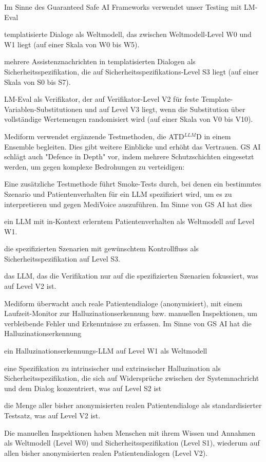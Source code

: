 \documentclass[twocolumn]{article}
\newcommand{\ATDLLMD}{ATD$^{LLM}$D}%
\begin{document}
Im Sinne des Guaranteed Safe AI Frameworks \cite{Dalrymple24} verwendet unser Testing mit LM-Eval
\begin{compactitem}
\item templatisierte Dialoge als Weltmodell, das zwischen Weltmodell-Level W0 und W1 liegt (auf einer Skala von W0 bis W5).
\item mehrere Assistenznachrichten in templatisierten Dialogen als Sicherheitsspezifikation, die auf Sicherheitsspezifikations-Level S3 liegt (auf einer Skala von S0 bis S7).
\item LM-Eval als Verifikator, der auf Verifikator-Level V2 für feste Template-Variablen-Substitutionen und auf Level V3 liegt, wenn die Substitution über vollständige Wertemengen randomisiert wird (auf einer Skala von V0 bis V10).
\end{compactitem}

Mediform verwendet ergänzende Testmethoden, die \ATDLLMD{} in einem Ensemble begleiten. Dies gibt weitere Einblicke und erhöht das Vertrauen. GS AI schlägt auch "Defence in Depth" vor, indem mehrere Schutzschichten eingesetzt werden, um gegen komplexe Bedrohungen zu verteidigen:

Eine zusätzliche Testmethode führt Smoke-Tests durch, bei denen ein bestimmtes Szenario und Patientenverhalten für ein LLM spezifiziert wird, um es zu interpretieren und gegen MediVoice auszuführen. Im Sinne von GS AI hat dies
\begin{compactitem}
\item ein LLM mit in-Kontext erlerntem Patientenverhalten als Weltmodell auf Level W1.
\item die spezifizierten Szenarien mit gewünschtem Kontrollfluss als Sicherheitsspezifikation auf Level S3.
\item das LLM, das die Verifikation nur auf die spezifizierten Szenarien fokussiert, was auf Level V2 ist.
\end{compactitem}

Mediform überwacht auch reale Patientendialoge (anonymisiert), mit einem Laufzeit-Monitor zur Halluzinationserkennung bzw. manuellen Inspektionen, um verbleibende Fehler und Erkenntnisse zu erfassen. Im Sinne von GS AI hat die Halluzinationserkennung
\begin{compactitem}
\item ein Halluzinationserkennungs-LLM auf Level W1 als Weltmodell
\item eine Spezifikation zu intrinsischer und extrinsischer Halluzination \cite{Ji23} als Sicherheitsspezifikation, die sich auf Widersprüche zwischen der Systemnachricht und dem Dialog konzentriert, was auf Level S2 ist
\item die Menge aller bisher anonymisierten realen Patientendialoge als standardisierter Testsatz, was auf Level V2 ist.
\end{compactitem}
Die manuellen Inspektionen haben Menschen mit ihrem Wissen und Annahmen als Weltmodell (Level W0) und Sicherheitsspezifikation (Level S1), wiederum auf allen bisher anonymisierten realen Patientendialogen (Level V2).
\end{document}
